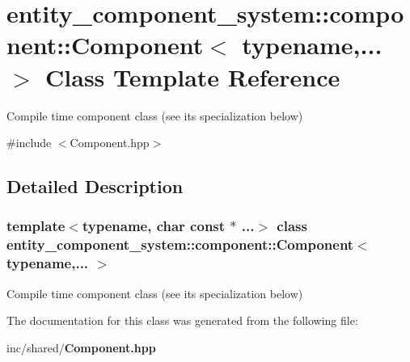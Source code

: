 \section{entity\+\_\+component\+\_\+system\+:\+:component\+:\+:Component$<$ typename,... $>$ Class Template Reference}
\label{classentity__component__system_1_1component_1_1_component}


Compile time component class (see its specialization below)  




{\ttfamily \#include $<$Component.\+hpp$>$}



\subsection{Detailed Description}
\subsubsection*{template$<$typename, char const $\ast$ ...$>$\newline
class entity\+\_\+component\+\_\+system\+::component\+::\+Component$<$ typename,... $>$}

Compile time component class (see its specialization below) 

The documentation for this class was generated from the following file\+:\begin{DoxyCompactItemize}
\item 
inc/shared/{\bf Component.\+hpp}\end{DoxyCompactItemize}
